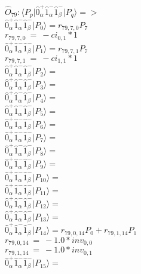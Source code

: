 \documentclass[14pt]{article}
\begin{document}
    $\hat{O}_{79}:  \langle{P_p}\vert \hat{0}_{\alpha}^{+}\hat{1}_{\alpha}^{-}\hat{1}_{\beta}^{-} \vert{P_q}\rangle => $ \\ 
    $ \hat{0}_{\alpha}^{+}\hat{1}_{\alpha}^{-}\hat{1}_{\beta}^{-} \vert{P_{0}}\rangle = {r}_{79,7,0}P_{7} $ \\ 
    ${r}_{79,7,0}\ =\ -{ci}_{0,1}*1 $ \\ 
    $ \hat{0}_{\alpha}^{+}\hat{1}_{\alpha}^{-}\hat{1}_{\beta}^{-} \vert{P_{1}}\rangle = {r}_{79,7,1}P_{7} $ \\ 
    ${r}_{79,7,1}\ =\ -{ci}_{1,1}*1 $ \\ 
    $ \hat{0}_{\alpha}^{+}\hat{1}_{\alpha}^{-}\hat{1}_{\beta}^{-} \vert{P_{2}}\rangle =  $ \\ 
    $ \hat{0}_{\alpha}^{+}\hat{1}_{\alpha}^{-}\hat{1}_{\beta}^{-} \vert{P_{3}}\rangle =  $ \\ 
    $ \hat{0}_{\alpha}^{+}\hat{1}_{\alpha}^{-}\hat{1}_{\beta}^{-} \vert{P_{4}}\rangle =  $ \\ 
    $ \hat{0}_{\alpha}^{+}\hat{1}_{\alpha}^{-}\hat{1}_{\beta}^{-} \vert{P_{5}}\rangle =  $ \\ 
    $ \hat{0}_{\alpha}^{+}\hat{1}_{\alpha}^{-}\hat{1}_{\beta}^{-} \vert{P_{6}}\rangle =  $ \\ 
    $ \hat{0}_{\alpha}^{+}\hat{1}_{\alpha}^{-}\hat{1}_{\beta}^{-} \vert{P_{7}}\rangle =  $ \\ 
    $ \hat{0}_{\alpha}^{+}\hat{1}_{\alpha}^{-}\hat{1}_{\beta}^{-} \vert{P_{8}}\rangle =  $ \\ 
    $ \hat{0}_{\alpha}^{+}\hat{1}_{\alpha}^{-}\hat{1}_{\beta}^{-} \vert{P_{9}}\rangle =  $ \\ 
    $ \hat{0}_{\alpha}^{+}\hat{1}_{\alpha}^{-}\hat{1}_{\beta}^{-} \vert{P_{10}}\rangle =  $ \\ 
    $ \hat{0}_{\alpha}^{+}\hat{1}_{\alpha}^{-}\hat{1}_{\beta}^{-} \vert{P_{11}}\rangle =  $ \\ 
    $ \hat{0}_{\alpha}^{+}\hat{1}_{\alpha}^{-}\hat{1}_{\beta}^{-} \vert{P_{12}}\rangle =  $ \\ 
    $ \hat{0}_{\alpha}^{+}\hat{1}_{\alpha}^{-}\hat{1}_{\beta}^{-} \vert{P_{13}}\rangle =  $ \\ 
    $ \hat{0}_{\alpha}^{+}\hat{1}_{\alpha}^{-}\hat{1}_{\beta}^{-} \vert{P_{14}}\rangle = {r}_{79,0,14}P_{0}+{r}_{79,1,14}P_{1} $ \\ 
    ${r}_{79,0,14}\ =\ -1.0*{inv}_{0,0} $ \\ 
    ${r}_{79,1,14}\ =\ -1.0*{inv}_{0,1} $ \\ 
    $ \hat{0}_{\alpha}^{+}\hat{1}_{\alpha}^{-}\hat{1}_{\beta}^{-} \vert{P_{15}}\rangle =  $ \\ 
    
\end{document}
